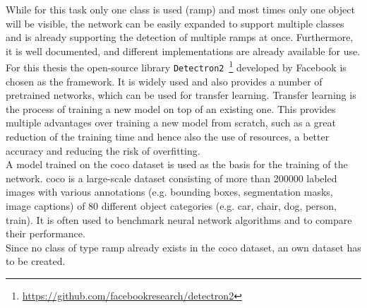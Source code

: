 While for this task only one class is used (ramp) and most times only one object will be visible, the network can be easily expanded to support multiple classes and is already supporting the detection of multiple ramps at once.
Furthermore, it is well documented, and different implementations are already available for use.\\
For this thesis the open-source library \texttt{Detectron2}~\footnote{\url{https://github.com/facebookresearch/detectron2}} \cite{Wu2019} developed by Facebook is chosen as the framework.
It is widely used and also provides a number of pretrained networks, which can be used for transfer learning.
Transfer learning is the process of training a new model on top of an existing one.
This provides multiple advantages over training a new model from scratch, such as a great reduction of the training time and hence also the use of resources, a better accuracy and reducing the risk of overfitting.\\
A model trained on the \gls{coco} dataset \cite{Lin2014} is used as the basis for the training of the network.
\gls{coco} is a large-scale dataset consisting of more than \num{200000} labeled images with various annotations (e.g. bounding boxes, segmentation masks, image captions) of 80 different object categories (e.g. car, chair, dog, person, train).
It is often used to benchmark neural network algorithms and to compare their performance.\\
Since no class of type ramp already exists in the \gls{coco} dataset, an own dataset has to be created.


